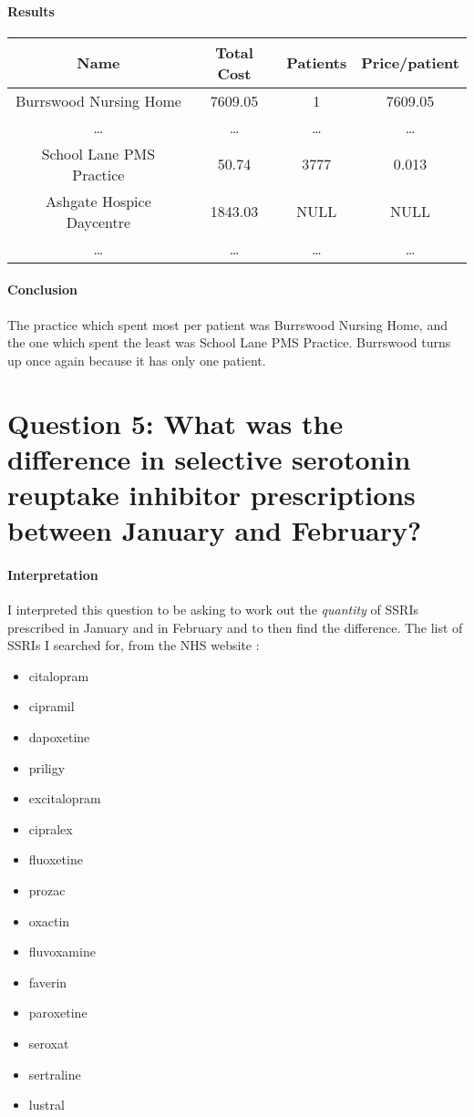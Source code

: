 \documentclass{report}
\begin{document}
\paragraph{Results}
\begin{center}
\begin{tabular}{ | c | c | c | c | }
\hline
Name & Total Cost & Patients & Price/patient \\
\hline
Burrswood Nursing Home & 7609.05 & 1 & 7609.05 \\
\hline
\ldots & \ldots & \ldots & \ldots \\
\hline
School Lane PMS Practice & 50.74 & 3777 & 0.013 \\
\hline
Ashgate Hospice Daycentre & 1843.03 & NULL & NULL \\
\hline
\ldots & \ldots & \ldots & \ldots \\
\hline
\end{tabular}
\end{center}

\paragraph{Conclusion}
The practice which spent most per patient was Burrswood Nursing Home, and the one which spent the least was School Lane PMS Practice. Burrswood turns up once again because it has only one patient.

\section{Question 5: What was the difference in selective serotonin reuptake inhibitor prescriptions between January and February?}

\paragraph{Interpretation}
I interpreted this question to be asking to work out the \textit{quantity} of SSRIs prescribed in January and in February and to then find the difference. The list of SSRIs I searched for, from the NHS website \cite{nhsssris}:
\begin{itemize}
\item citalopram
\item cipramil
\item dapoxetine
\item priligy
\item excitalopram
\item cipralex
\item fluoxetine
\item prozac
\item oxactin
\item fluvoxamine
\item faverin
\item paroxetine
\item seroxat
\item sertraline
\item lustral
\end{itemize}
\end{document}
